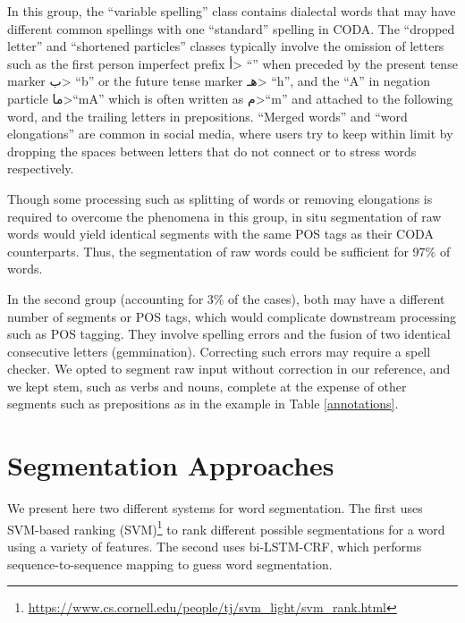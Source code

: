 \documentclass[11pt,letterpaper]{article}
\begin{document}
In this group, the ``variable spelling'' class contains dialectal words that may have different common spellings with one ``standard'' spelling in CODA. The ``dropped letter'' and ``shortened particles'' classes typically involve the omission of letters such as the first person imperfect prefix \<أ> ``'' when preceded by the present tense marker \<ب> ``b'' or the future tense marker \<هـ> ``h'', and the ``A'' in negation particle \<ما>``mA'' which is often written as \<م>``m'' and attached to the following word, and the trailing letters in prepositions. ``Merged words'' and ``word elongations'' are common in social media, where users try to keep within limit by dropping the spaces between letters that do not connect or to stress words respectively.

Though some processing such as splitting of words or removing elongations is required to overcome the phenomena in this group, in situ segmentation of raw words would yield identical segments with the same POS tags as their CODA counterparts.  Thus, the segmentation of raw words could be sufficient for 97\% of words. 


In the second group (accounting for 3\% of the cases), both may have a different number of segments or POS tags, which would complicate downstream processing such as POS tagging.  They involve spelling errors and the fusion of two identical consecutive letters (gemmination). Correcting such errors may require a spell checker.  We opted to segment raw input without correction in our reference, and we kept stem, such as verbs and nouns, complete at the expense of other segments such as prepositions as in the example in Table \ref{annotations}.













\section{Segmentation Approaches}
\label{segmentationapproaches}
We present here two different systems for word segmentation. The first uses SVM-based ranking (SVM)\footnote{\url{https://www.cs.cornell.edu/people/tj/svm_light/svm_rank.html}} to rank different possible segmentations for a word using a variety of features. The second uses bi-LSTM-CRF, which performs sequence-to-sequence mapping to guess word segmentation.
\end{document}
